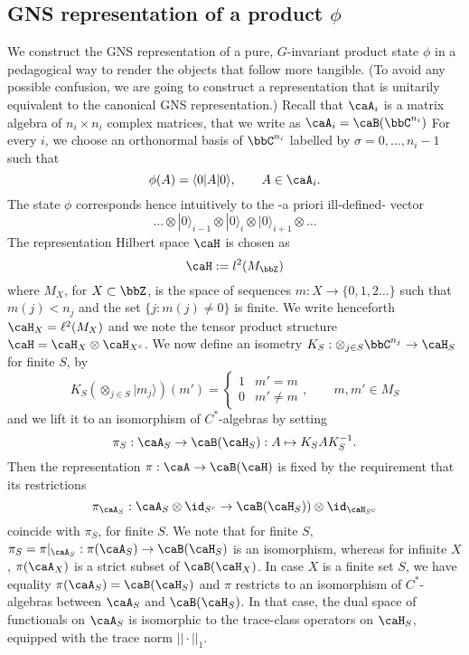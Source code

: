 \subsection{GNS representation of a product $\phi$}
We construct the GNS representation of a pure, $G$-invariant product state $\phi$ in a pedagogical way to render the objects that follow more tangible. (To avoid any possible confusion, we are going to construct a representation that is unitarily equivalent to the canonical GNS representation.)
Recall that $\caA_i$ is a matrix algebra of $n_i\times n_i$ complex matrices, that we write as $\caA_i= \caB(\bbC^{n_i})$ For every $i$, we choose an orthonormal basis of $\bbC^{n_i}$ labelled by $\sigma=0,\ldots, n_i-1$ such that 
$$
\phi(A)=\langle 0|  A | 0\rangle,\qquad A\in \caA_i.
$$
The state $\phi$ corresponds hence intuitively to the -a priori ill-defined- vector 
\begin{equation}\label{eq: gns intuitive}
	\ldots \otimes | 0\rangle_{i-1} \otimes | 0\rangle_i \otimes | 0\rangle_{i+1} \otimes \ldots
\end{equation}
The representation Hilbert space $\caH$ is chosen as 
$$
\caH := l^2(M_\bbZ)
$$
where $M_X$, for $X\subset\bbZ$, is the space of sequences $m:X\to \{0,1,2\ldots\}$ such that $m(j) < n_j$ and the set $\{j: m(j)\neq 0\}$ is finite. We write henceforth $\caH_X=\ell^2(M_X)$  and we note the tensor product structure $\caH=\caH_X \otimes \caH_{X^c}$.
We now define an isometry $K_S: \otimes_{j\in S}\bbC^{n_j}\to\caH_S$ for finite $S$, by 
$$
K_S(\otimes_{j\in S}|m_j\rangle)(m')=\begin{cases}  1 &  m'=m \\
	0 &   m'\neq m
\end{cases},\qquad   m,m'\in M_S
$$
and we lift it to an isomorphism of $C^*$-algebras by setting
$$
\pi_S: \caA_S \to \caB(\caH_S):  A \mapsto K_SA K_S^{-1}.
$$
Then the representation $\pi:\caA\to\caB(\caH)$ is fixed by the requirement that its restrictions 
$$
\pi_{\caA_S}:  \caA_S \otimes \id_{S^c} \to   \caB(\caH_S))\otimes \id_{\caH_{S^c}}
$$
coincide with $\pi_S$, for finite $S$.  We note that for finite $S$, $\pi_S=\pi|_{\caA_S}: \pi(\caA_S)\to\caB(\caH_S)$ is an isomorphism, whereas for infinite $X$,  $\pi(\caA_X)$ is a strict subset of $\caB(\caH_X)$. In case $X$ is a finite set $S$, we have equality $\pi(\caA_S)=\caB(\caH_S)$ and  $\pi$ restricts to an isomorphism of $C^*$-algebras between $\caA_S$ and $\caB(\caH_S)$.     In that case, the dual space of functionals on $\caA_S$ is isomorphic to the trace-class operators on $\caH_S$, equipped with the trace norm $||\cdot||_1$.
